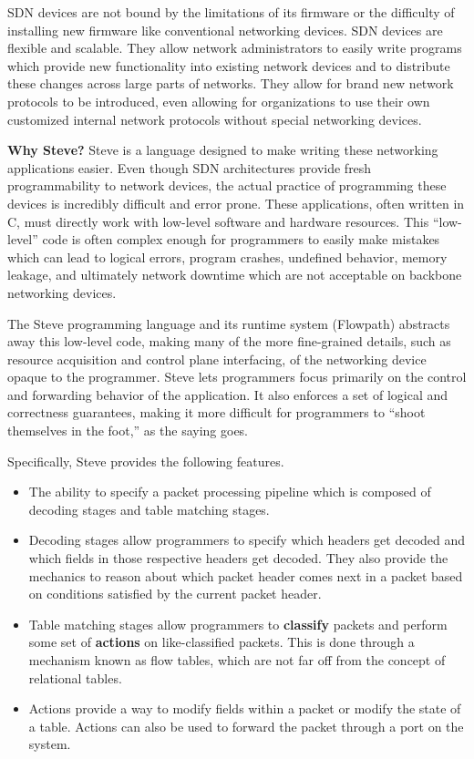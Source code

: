 SDN devices are not bound by the limitations of its firmware or the difficulty of installing new firmware like conventional networking devices. SDN devices are flexible and scalable. They allow network administrators to easily write programs which provide new functionality into existing network devices and to distribute these changes across large parts of networks. They allow for brand new network protocols to be introduced, even allowing for organizations to use their own customized internal network protocols without special networking devices.

\textbf{Why Steve?} Steve is a language designed to make writing these networking applications easier. Even though SDN architectures provide fresh programmability to network devices, the actual practice of programming these devices is incredibly difficult and error prone. These applications, often written in C, must directly work with low-level software and hardware resources. This “low-level” code is often complex enough for programmers to easily make mistakes which can lead to logical errors, program crashes, undefined behavior, memory leakage, and ultimately network downtime which are not acceptable on backbone networking devices.

The Steve programming language and its runtime system (Flowpath) abstracts away this low-level code, making many of the more fine-grained details, such as resource acquisition and control plane interfacing, of the networking device opaque to the programmer. Steve lets programmers focus primarily on the control and forwarding behavior of the application. It also enforces a set of logical and correctness guarantees, making it more difficult for programmers to “shoot themselves in the foot,” as the saying goes.

Specifically, Steve provides the following features.

\begin{itemize}
\item The ability to specify a packet processing pipeline which is composed of decoding stages and table matching stages.

\item Decoding stages allow programmers to specify which headers get decoded and which fields in those respective headers get decoded. They also provide the mechanics to reason about which packet header comes next in a packet based on conditions satisfied by the current packet header.

\item 
Table matching stages allow programmers to \textbf{classify} packets and perform some set of \textbf{actions} on like-classified packets. This is done through a mechanism known as flow tables, which are not far off from the concept of relational tables.

\item
Actions provide a way to modify fields within a packet or modify the state of a table. Actions can also be used to forward the packet through a port on the system.

\end{itemize}
